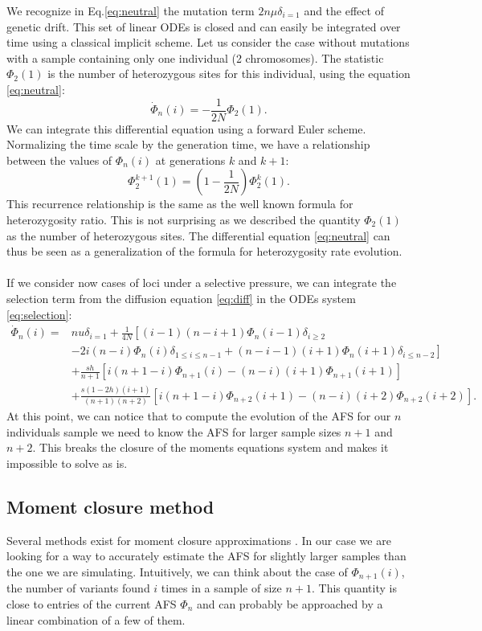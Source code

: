 We recognize in Eq.\eqref{eq:neutral} the mutation term $2n\mu  \delta_{i=1}$ and the effect of genetic drift. This set of linear ODEs is closed and can easily be integrated over time using a classical implicit scheme.
Let us consider the case without mutations with a sample containing only one individual (2 chromosomes). The statistic $\Phi_2(1)$ is the number of heterozygous sites for this individual, using the equation \eqref{eq:neutral}: 
$$
	\dot \Phi_n(i)= -\frac{1}{2 N} \Phi_2(1).
$$
We can integrate this differential equation using a forward Euler scheme. Normalizing the time scale by the generation time, we have a relationship between the values of $\Phi_n(i)$ at generations $k$ and $k+1$:
$$
	\Phi_2^{k+1}(1) = (1-\frac{1}{2 N})\Phi_2^k(1).
$$
This recurrence relationship is the same as the well known formula for heterozygosity ratio. This is not surprising as we described the quantity $\Phi_2(1)$ as the number of heterozygous sites. The differential equation \eqref{eq:neutral} can thus be seen as a generalization of the formula for heterozygosity rate evolution.

\paragraph{}
If we consider now cases of loci under a selective pressure, we can integrate the selection term from the diffusion equation \eqref{eq:diff} in the ODEs system \eqref{eq:selection}:
\begin{equation}
\begin{split}
\dot \Phi_n(i)=& nu  \delta_{i=1} + \frac{1}{4 N} \left[ (i-1)(n-i+1) \Phi_n(i-1)\delta_{i\geq 2} \right.\\
		      & \left.-2i(n-i)\Phi_n(i)\delta_{1\leq i\leq n-1}  + (n-i-1)(i+1)\Phi_n(i+1)\delta_{i\leq n-2} \right]\\
		      &+ \frac{sh}{n+1}\left[i(n+1-i)\Phi_{n+1}(i)-(n-i)(i+1)\Phi_{n+1}(i+1)\right] \\
		      & +\frac{s(1-2h)(i+1)}{(n+1)(n+2)}\left[i(n+1-i)\Phi_{n+2}(i+1)-(n-i)(i+2)\Phi_{n+2}(i+2)\right].
\end{split}
\label{eq:syst_edo_1pop}
\end{equation}
 At this point, we can notice that to compute the evolution of the AFS for our $n$ individuals sample we need to know the AFS for larger sample sizes $n+1$ and $n+2$. This breaks the closure of the moments equations system and makes it impossible to solve as is.
 
\subsection{Moment closure method}
Several methods exist for moment closure approximations \cite{kuehn2016}. In our case we are looking for a way to accurately estimate the AFS for slightly larger samples than the one we are simulating. Intuitively, we can think about the case of $\Phi_{n+1}(i)$, the number of variants found $i$ times in a sample of size $n+1$. This quantity is close to entries of the current AFS $\Phi_n$ and can probably be approached by a linear combination of a few of them.

